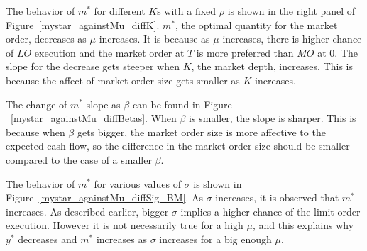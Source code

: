 \documentclass[11pt]{article}
\theoremstyle{plain}
\numberwithin{equation}{section}
\begin{document}
{\par The behavior of $m^*$ for different $K$s with a fixed $\rho$ is shown in the right panel of Figure~\ref{mystar_againstMu_diffK}. $m^*$,  the optimal quantity for the market order, decreases as $\mu$ increases. It is because as $\mu$ increases, there is higher chance of $LO$ execution and the market order at $T$ is more preferred than $MO$ at $0$. The slope for the decrease gets steeper when $K$, the market depth, increases. This is because the affect of market order size gets smaller as $K$ increases. 


\par The change of $m^*$ slope as $\beta$ can be found in Figure ~\ref{mystar_againstMu_diffBetas}. When $\beta$ is smaller, the slope is sharper. This is because when $\beta$ gets bigger, the market order size is more affective to the expected cash flow, so the difference in the market order size should be smaller compared to the case of a smaller $\beta$. 

\par The behavior of  $m^*$ for various values of $\sigma$ is shown in Figure~\ref{mystar_againstMu_diffSig_BM}.  As $\sigma$ increases, it is observed that $m^*$ increases. As described earlier, bigger $\sigma$ implies a higher chance of the limit order execution. However it is not necessarily true for a high $\mu$, and this explains why $y^*$ decreases and $m^*$ increases as $\sigma$ increases for a big enough $\mu$. 



%
%
%

}
\end{document}
